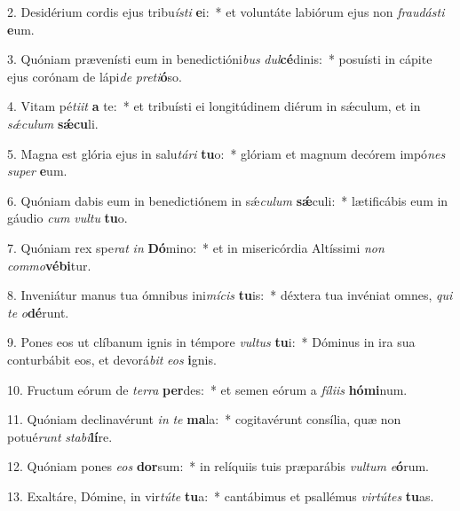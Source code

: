 2. Desidérium cordis ejus tribu\textit{ís}\textit{ti} \textbf{e}i:~*  et voluntáte labiórum ejus non \textit{frau}\textit{dás}\textit{ti} \textbf{e}um.\

3. Quóniam prævenísti eum in benedictióni\textit{bus} \textit{dul}\textbf{cé}dinis:~*  posuísti in cápite ejus corónam de lápi\textit{de} \textit{pre}\textit{ti}\textbf{ó}so.\

4. Vitam pé\textit{ti}\textit{it} \textbf{a} te:~*  et tribuísti ei longitúdinem diérum in sǽculum, et in \textit{sǽ}\textit{cu}\textit{lum} \textbf{sǽ}\textbf{cu}li.\

5. Magna est glória ejus in salu\textit{tá}\textit{ri} \textbf{tu}o:~*  glóriam et magnum decórem impó\textit{nes} \textit{su}\textit{per} \textbf{e}um.\

6. Quóniam dabis eum in benedictiónem in sǽ\textit{cu}\textit{lum} \textbf{sǽ}culi:~*  lætificábis eum in gáudio \textit{cum} \textit{vul}\textit{tu} \textbf{tu}o.\

7. Quóniam rex spe\textit{rat} \textit{in} \textbf{Dó}mino:~*  et in misericórdia Altíssimi \textit{non} \textit{com}\textit{mo}\textbf{vé}\textbf{bi}tur.\

8. Inveniátur manus tua ómnibus ini\textit{mí}\textit{cis} \textbf{tu}is:~*  déxtera tua invéniat omnes, \textit{qui} \textit{te} \textit{o}\textbf{dé}runt.\

9. Pones eos ut clíbanum ignis in témpore \textit{vul}\textit{tus} \textbf{tu}i:~*  Dóminus in ira sua conturbábit eos, et devorá\textit{bit} \textit{e}\textit{os} \textbf{i}gnis.\

10. Fructum eórum de \textit{ter}\textit{ra} \textbf{per}des:~*  et semen eórum a \textit{fí}\textit{li}\textit{is} \textbf{hó}\textbf{mi}num.\

11. Quóniam declinavérunt \textit{in} \textit{te} \textbf{ma}la:~*  cogitavérunt consília, quæ non potué\textit{runt} \textit{sta}\textit{bi}\textbf{lí}re.\

12. Quóniam pones \textit{e}\textit{os} \textbf{dor}sum:~*  in relíquiis tuis præparábis \textit{vul}\textit{tum} \textit{e}\textbf{ó}rum.\

13. Exaltáre, Dómine, in vir\textit{tú}\textit{te} \textbf{tu}a:~*  cantábimus et psallémus \textit{vir}\textit{tú}\textit{tes} \textbf{tu}as.\

